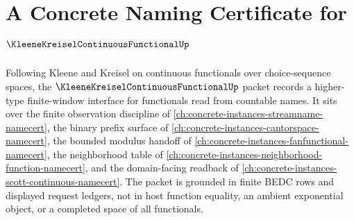 \chapter{A Concrete Naming Certificate for $\KleeneKreiselContinuousFunctionalUp$}
\label{ch:concrete-instances-kleene-kreisel-continuous-functional-namecert}

Following Kleene and Kreisel on continuous functionals over choice-sequence spaces, the $\KleeneKreiselContinuousFunctionalUp$ packet records a higher-type finite-window interface for functionals read from countable names. It sits over the finite observation discipline of \autoref{ch:concrete-instances-streamname-namecert}, the binary prefix surface of \autoref{ch:concrete-instances-cantorspace-namecert}, the bounded modulus handoff of \autoref{ch:concrete-instances-fanfunctional-namecert}, the neighborhood table of \autoref{ch:concrete-instances-neighborhood-function-namecert}, and the domain-facing readback of \autoref{ch:concrete-instances-scott-continuous-namecert}. The packet is grounded in finite BEDC rows and displayed request ledgers, not in host function equality, an ambient exponential object, or a completed space of all functionals.

